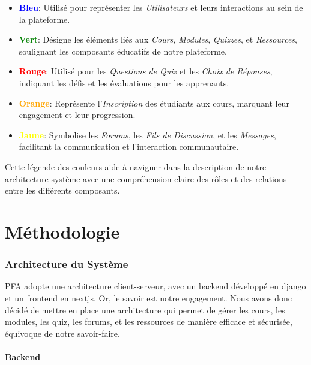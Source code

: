 \begin{itemize}
    \item \textbf{\textcolor{blue}{\textbullet}} \textbf{\textcolor{blue}{Bleu}}: Utilisé pour représenter les \textit{Utilisateurs} et leurs interactions au sein de la plateforme.
    \item \textbf{\textcolor{green}{\textbullet}} \textbf{\textcolor{green}{Vert}}: Désigne les éléments liés aux \textit{Cours}, \textit{Modules}, \textit{Quizzes}, et \textit{Ressources}, soulignant les composants éducatifs de notre plateforme.
    \item \textbf{\textcolor{red}{\textbullet}} \textbf{\textcolor{red}{Rouge}}: Utilisé pour les \textit{Questions de Quiz} et les \textit{Choix de Réponses}, indiquant les défis et les évaluations pour les apprenants.
    \item \textbf{\textcolor{orange}{\textbullet}} \textbf{\textcolor{orange}{Orange}}: Représente l'\textit{Inscription} des étudiants aux cours, marquant leur engagement et leur progression.
    \item \textbf{\textcolor{yellow}{\textbullet}} \textbf{\textcolor{yellow}{Jaune}}: Symbolise les \textit{Forums}, les \textit{Fils de Discussion}, et les \textit{Messages}, facilitant la communication et l'interaction communautaire.
\end{itemize}

Cette légende des couleurs aide à naviguer dans la description de notre architecture système avec une compréhension claire des rôles et des relations entre les différents composants.
\newpage
\part{Méthodologie}

\section{Architecture du Système}

PFA adopte une architecture client-serveur, avec un backend développé en \gls{django} et un frontend en \gls{nextjs}.
Or, le savoir est notre engagement. Nous avons donc décidé de mettre en place une architecture qui permet de gérer les cours, les modules, les quiz, les forums, et les ressources de manière efficace et sécurisée, équivoque de notre savoir-faire.

\subsection{Backend}

